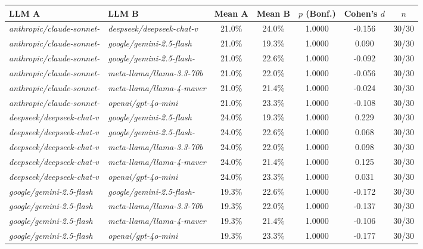 \begin{table}
\centering
{\scriptsize
\begin{tabular}{l|l|c|c|c|c|c}
\textbf{LLM A} & \textbf{LLM B} & \textbf{Mean A} & \textbf{Mean B} & \textbf{$p$ (Bonf.)} & \textbf{Cohen's $d$} & \textbf{$n$} \\
\hline\hline
\textit{anthropic/claude-sonnet-} & \textit{deepseek/deepseek-chat-v} & 21.0\% & 24.0\% & 1.0000 & -0.156 & 30/30 \\
\textit{anthropic/claude-sonnet-} & \textit{google/gemini-2.5-flash} & 21.0\% & 19.3\% & 1.0000 & 0.090 & 30/30 \\
\textit{anthropic/claude-sonnet-} & \textit{google/gemini-2.5-flash-} & 21.0\% & 22.6\% & 1.0000 & -0.092 & 30/30 \\
\textit{anthropic/claude-sonnet-} & \textit{meta-llama/llama-3.3-70b} & 21.0\% & 22.0\% & 1.0000 & -0.056 & 30/30 \\
\textit{anthropic/claude-sonnet-} & \textit{meta-llama/llama-4-maver} & 21.0\% & 21.4\% & 1.0000 & -0.024 & 30/30 \\
\textit{anthropic/claude-sonnet-} & \textit{openai/gpt-4o-mini} & 21.0\% & 23.3\% & 1.0000 & -0.108 & 30/30 \\
\textit{deepseek/deepseek-chat-v} & \textit{google/gemini-2.5-flash} & 24.0\% & 19.3\% & 1.0000 & 0.229 & 30/30 \\
\textit{deepseek/deepseek-chat-v} & \textit{google/gemini-2.5-flash-} & 24.0\% & 22.6\% & 1.0000 & 0.068 & 30/30 \\
\textit{deepseek/deepseek-chat-v} & \textit{meta-llama/llama-3.3-70b} & 24.0\% & 22.0\% & 1.0000 & 0.098 & 30/30 \\
\textit{deepseek/deepseek-chat-v} & \textit{meta-llama/llama-4-maver} & 24.0\% & 21.4\% & 1.0000 & 0.125 & 30/30 \\
\textit{deepseek/deepseek-chat-v} & \textit{openai/gpt-4o-mini} & 24.0\% & 23.3\% & 1.0000 & 0.031 & 30/30 \\
\textit{google/gemini-2.5-flash} & \textit{google/gemini-2.5-flash-} & 19.3\% & 22.6\% & 1.0000 & -0.172 & 30/30 \\
\textit{google/gemini-2.5-flash} & \textit{meta-llama/llama-3.3-70b} & 19.3\% & 22.0\% & 1.0000 & -0.137 & 30/30 \\
\textit{google/gemini-2.5-flash} & \textit{meta-llama/llama-4-maver} & 19.3\% & 21.4\% & 1.0000 & -0.106 & 30/30 \\
\textit{google/gemini-2.5-flash} & \textit{openai/gpt-4o-mini} & 19.3\% & 23.3\% & 1.0000 & -0.177 & 30/30 \\

\end{tabular}}
\end{table}
